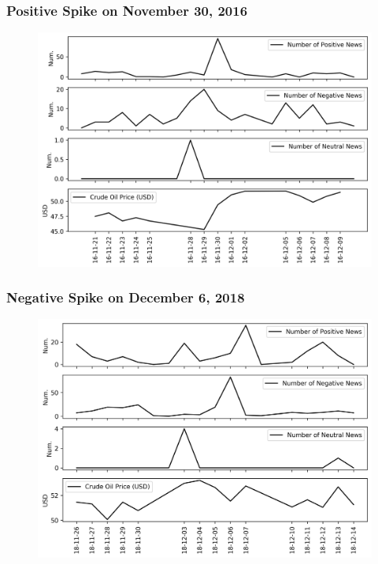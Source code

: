 \documentclass[12pt]{article}
\begin{document}
	\subsubsection{Positive Spike on November 30, 2016}
	\begin{figure}[H]
		\centering
		\small
		\includegraphics[width=\linewidth]{figures/case_studies/20161130_10d.png}
		\caption{}
	\end{figure}
	
	\subsubsection{Negative Spike on December 6, 2018}
	\begin{figure}[H]
		\centering
		\small
		\includegraphics[width=\linewidth]{figures/case_studies/20181206_10d.png}
		\caption{}
	\end{figure}
	
\end{document}

